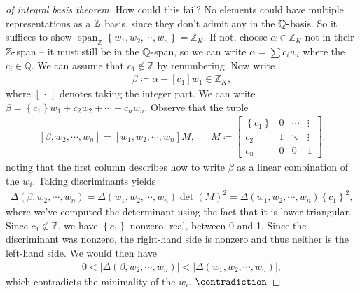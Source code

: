 \begin{proof}[of integral basis theorem]
How could this fail? No elements could have multiple representations as
a \({\mathbb{Z}}{\hbox{-}}\)basis, since they don't admit any in the
\({\mathbb{Q}}{\hbox{-}}\)basis. So it suffices to show
\({\operatorname{span}}_{\mathbb{Z}}\left\{{ { {w}_1, {w}_2, \cdots, {w}_{n}} }\right\} = {\mathbb{Z}}_K\).
If not, choose \(\alpha\in {\mathbb{Z}}_K\) not in their
\({\mathbb{Z}}{\hbox{-}}\)span -- it must still be in the
\({\mathbb{Q}}{\hbox{-}}\)span, so we can write \(\alpha= \sum c_i w_i\)
where the \(c_i\in {\mathbb{Q}}\). We can assume that
\(c_1\not \in {\mathbb{Z}}\) by renumbering. Now write
\begin{align*}
\beta \coloneqq\alpha - \left[ {c_1}\right]  w_1 \in {\mathbb{Z}}_K
,\end{align*}
where \(\left[ {{\,\cdot\,}}\right]\) denotes taking the integer part.
We can write
\(\beta = \left\{{c_1}\right\}w_1 + c_2 w_2 + \cdots + c_n w_n\).
Observe that the tuple
\begin{align*}
{\left[ { \beta, w_2, \cdots, w_n} \right]} 
= {\left[ { w_1 , w_2, \cdots, w_n} \right]} 
M,
&& 
M \coloneqq
\begin{bmatrix}
\left\{{c_1}\right\} & 0  & \cdots & \vdots \\
c_2 &  1 & \ddots & \vdots \\
c_n &  0 & 0 & 1
\end{bmatrix}
.\end{align*}
noting that the first column describes how to write \(\beta\) as a
linear combination of the \(w_i\). Taking discriminants yields
\begin{align*}
{\Delta}(\beta, w_2, \cdots, w_n) 
= {\Delta}( { {w}_1, {w}_2, \cdots, {w}_{n}} )\det(M)^2
= {\Delta}( { {w}_1, {w}_2, \cdots, {w}_{n}} )\left\{{c_1}\right\}^2
,\end{align*}
where we've computed the determinant using the fact that it is lower
triangular. Since \(c_1\not\in{\mathbb{Z}}\), we have
\(\left\{{c_1}\right\}\) nonzero, real, between 0 and 1. Since the
discriminant was nonzero, the right-hand side is nonzero and thus
neither is the left-hand side. We would then have
\begin{align*}
0 < 
{\left\lvert { {\Delta}( \beta, w_2, \cdots, w_n) } \right\rvert}
<
{\left\lvert { {\Delta}( { {w}_1, {w}_2, \cdots, {w}_{n}} ) } \right\rvert}
,\end{align*}
which contradicts the minimality of the \(w_i\). \(\contradiction\)

\end{proof}

